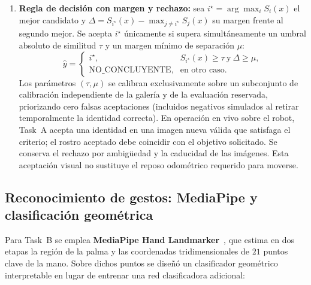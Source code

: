\documentclass[11pt,a4paper]{article}
\begin{document}
\begin{enumerate}
  \item \textbf{Regla de decisión con margen y rechazo:} sea $i^\star=\arg\max_i
  S_i(x)$ el mejor candidato y $\Delta=S_{i^\star}(x)-\max_{j\ne i^\star}S_j(x)$
  su margen frente al segundo mejor. Se acepta $i^\star$ únicamente si supera
  simultáneamente un umbral absoluto de similitud $\tau$ y un margen mínimo de
  separación $\mu$:
  \begin{equation}
    \widehat y =
    \begin{cases}
      i^\star, & S_{i^\star}(x)\geq\tau\ \text{y}\ \Delta\geq\mu,\\
      \text{NO\_CONCLUYENTE}, & \text{en otro caso}.
    \end{cases}
    \label{eq:decision}
  \end{equation}
  Los parámetros $(\tau,\mu)$ se calibran exclusivamente sobre un subconjunto de
  calibración independiente de la galería y de la evaluación reservada,
  priorizando cero falsas aceptaciones (incluidos negativos simulados al
  retirar temporalmente la identidad correcta). En operación en vivo sobre el
  robot, Task~A acepta una identidad en una imagen nueva válida que satisfaga
  el criterio; el rostro aceptado debe coincidir con el objetivo solicitado.
  Se conserva el rechazo por ambigüedad y la caducidad de las imágenes. Esta
  aceptación visual no sustituye el reposo odométrico requerido para moverse.
\end{enumerate}

\subsection{Reconocimiento de gestos: MediaPipe y clasificación geométrica}
\label{sec:algoritmo_gestos}

Para Task~B se emplea \textbf{MediaPipe Hand Landmarker}~\cite{mediapipe}, que
estima en dos etapas la región de la palma y las coordenadas tridimensionales
de $21$ puntos clave de la mano. Sobre dichos puntos se diseñó un clasificador
geométrico interpretable en lugar de entrenar una red clasificadora adicional:
\end{document}
